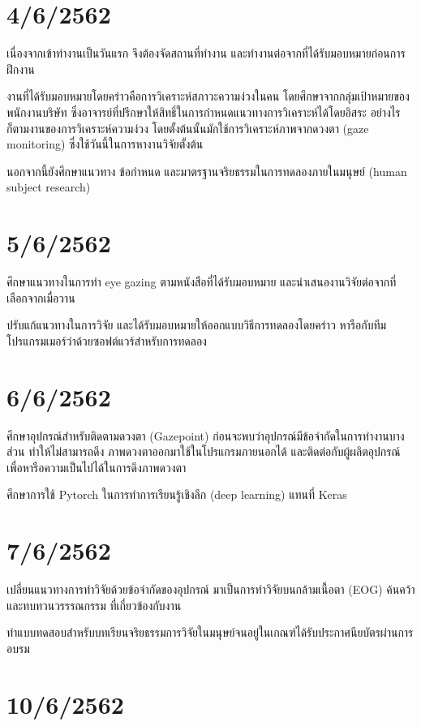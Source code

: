 \section*{4/6/2562}

เนื่องจากเข้าทำงานเป็นวันแรก จึงต้องจัดสถานที่ทำงาน และทำงานต่อจากที่ได้รับมอบหมายก่อนการฝึกงาน

งานที่ได้รับมอบหมายโดยคร่าวคือการวิเคราะห์สภาวะความง่วงในคน โดยศึกษาจากกลุ่มเป้าหมายของพนักงานบริษัท
ซึ่งอาจารย์ที่ปรึกษาให้สิทธิ์ในการกำหนดแนวทางการวิเคราะห์ได้โดยอิสระ อย่างไรก็ตามงานของการวิเคราะห์ความง่วง
โดยตั้งต้นนั้นมักใช้การวิเคราะห์ภาพจากดวงตา (gaze monitoring) ซึ่งใช้วันนี้ในการหางานวิจัยตั้งต้น

นอกจากนี้ยังศึกษาแนวทาง ข้อกำหนด และมาตรฐานจริยธรรมในการทดลองภายในมนุษย์ (human subject research)

\section*{5/6/2562}

ศึกษาแนวทางในการทำ eye gazing ตามหนังสือที่ได้รับมอบหมาย และนำเสนองานวิจัยต่อจากที่เลือกจากเมื่อวาน

ปรับแก้แนวทางในการวิจัย และได้รับมอบหมายให้ออกแบบวิธีการทดลองโดยคร่าว
หารือกับทีมโปรแกรมเมอร์ว่าด้วยซอฟต์แวร์สำหรับการทดลอง

\section*{6/6/2562}

ศึกษาอุปกรณ์สำหรับติดตามดวงตา (Gazepoint) ก่อนจะพบว่าอุปกรณ์มีข้อจำกัดในการทำงานบางส่วน ทำให้ไม่สามารถดึง
ภาพดวงตาออกมาใช้ในโปรแกรมภายนอกได้ และติดต่อกับผู้ผลิตอุปกรณ์เพื่อหารือความเป็นไปได้ในการดึงภาพดวงตา

ศึกษาการใช้ Pytorch ในการทำการเรียนรู้เชิงลึก (deep learning) แทนที่ Keras

\section*{7/6/2562}

เปลี่ยนแนวทางการทำวิจัยด้วยข้อจำกัดของอุปกรณ์ มาเป็นการทำวิจัยบนกล้ามเนื้อตา (EOG) ค้นคว้าและทบทวนวรรรณกรรม
ที่เกี่ยวข้องกับงาน

ทำแบบทดสอบสำหรับบทเรียนจริยธรรมการวิจัยในมนุษย์จนอยู่ในเกณฑ์ได้รับประกาศนียบัตรผ่านการอบรม

\section*{10/6/2562}

